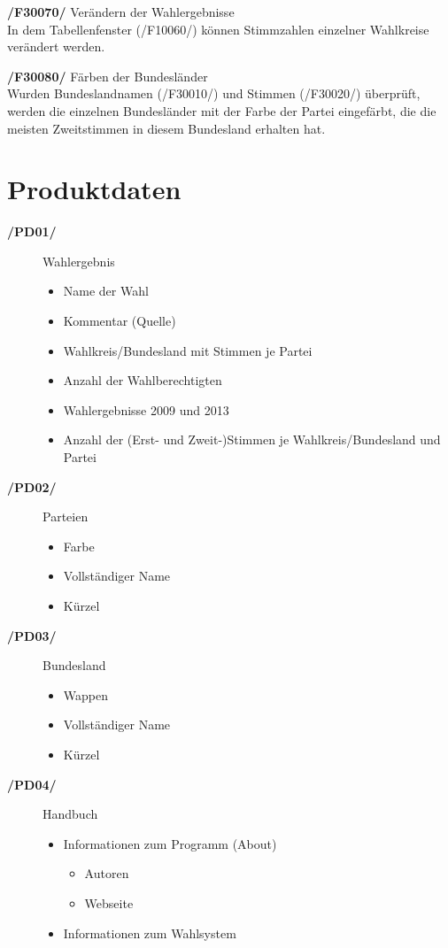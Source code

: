 \documentclass[10pt,a4paper]{article}
\begin{document}
\begin{description}
	\item \textbf{/F30070/} Verändern der Wahlergebnisse \hfill \\
	In dem Tabellenfenster (/F10060/) können Stimmzahlen einzelner Wahlkreise verändert werden.
	\item \textbf{/F30080/} Färben der Bundesländer \hfill \\
	Wurden Bundeslandnamen (/F30010/) und Stimmen (/F30020/) überprüft, werden die einzelnen Bundesländer mit der Farbe der Partei eingefärbt, die die meisten Zweitstimmen in diesem Bundesland erhalten hat.
	
\end{description}

\newpage

\section{Produktdaten}
\begin{description}
	\item[\textbf{/PD01/}] Wahlergebnis
	\begin{itemize}
		\item Name der Wahl
		\item Kommentar (Quelle)
		\item Wahlkreis/Bundesland mit Stimmen je Partei
		\item Anzahl der Wahlberechtigten
		\item Wahlergebnisse 2009 und 2013
		\item Anzahl der (Erst- und Zweit-)Stimmen je Wahlkreis/Bundesland und Partei
	\end{itemize}
	
	\item[\textbf{/PD02/}] Parteien
	\begin{itemize}
		\item Farbe
		\item Vollständiger Name
		\item Kürzel
	\end{itemize}
	
	\item[\textbf{/PD03/}] Bundesland
	\begin{itemize}
		\item Wappen		
		\item Vollständiger Name
		\item Kürzel
	\end{itemize}
	
	\item[\textbf{/PD04/}] Handbuch
	\begin{itemize}
		\item Informationen zum Programm (About)
		\begin{itemize}
			\item Autoren
			\item Webseite
		\end{itemize}
		\item Informationen zum Wahlsystem
	\end{itemize}
\end{description}
\end{document}
